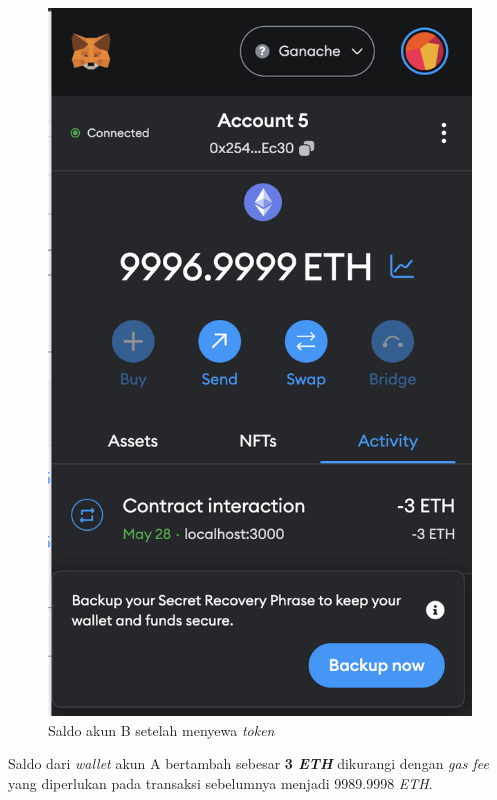 \begin{itemize}
\begin{figure} [H]
          \includegraphics[scale=0.4]{gambar/img-test-rent-rent-5.png}
          \caption{Saldo akun B setelah menyewa \emph{token}}
          \label{fig:TestRentResultRental3}
        \end{figure}
      Saldo dari \emph{wallet} akun A bertambah sebesar \textbf{3 \emph{ETH}} dikurangi dengan \emph{gas fee} yang diperlukan pada transaksi sebelumnya menjadi 9989.9998 \emph{ETH}. 
      \begin{figure} [H] \centering

\end{figure}
\end{itemize}
